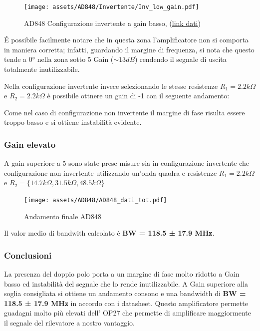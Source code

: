 \begin{figure}
    \centering
    \texttt{[image: assets/AD848/Invertente/Inv\_low\_gain.pdf]}
    \caption{AD848 Configurazione invertente a gain basso, (\href{https://github.com/Yedi278/Esperimentazioni-Elettronica/tree/main/-\%20OPAMP/AD848/Invertente/R1\%202.2k\%20R2\%202.2k\%20Instabilit\%C3\%A0/Quadra}{link dati})}
\end{figure}

$$$$
\'E possibile facilmente notare che in questa zona l'amplificatore non si comporta in maniera corretta; infatti, guardando il margine di frequenza, si nota che questo tende a 0° nella zona sotto 5 Gain ($\sim 13 dB$) rendendo il segnale di uscita totalmente inutilizzabile.

Nella configurazione invertente invece selezionando le stesse resistenze $R_1 = 2.2k\Omega$ e $R_2 = 2.2k\Omega$ è possibile ottnere un gain di -1 con il seguente andamento:


Come nel caso di configurazione non invertente il margine di fase risulta essere troppo basso e si ottiene instabilità evidente.

\pagebreak
\subsubsection{Gain elevato}

A gain superiore a 5 sono state prese misure sia in configurazione invertente che configurazione non invertente utilizzando un'onda quadra e resistenze $R_1 = 2.2k\Omega$ e $R_2 = \{ 14.7k\Omega, 31.5k\Omega, 48.5k\Omega \}$

\begin{figure}[!h]
    \centering
    \texttt{[image: assets/AD848/AD848\_dati\_tot.pdf]}
    \caption{Andamento finale AD848 }
\end{figure}

Il valor medio di bandwith calcolato è \textbf{BW = 118.5 ± 17.9 MHz}.

\subsubsection{Conclusioni}
La presenza del doppio polo porta a un margine di fase molto ridotto a Gain basso ed instabilità del segnale che lo rende inutilizzabile. A Gain superiore alla soglia consigliata si ottiene un andamento consono e una bandwidth di \textbf{BW = 118.5 ± 17.9 MHz} in accordo con i datasheet.
Questo amplificatore permette guadagni molto più elevati dell' OP27 che permette di amplificare maggiormente il segnale del rilevatore a nostro vantaggio.